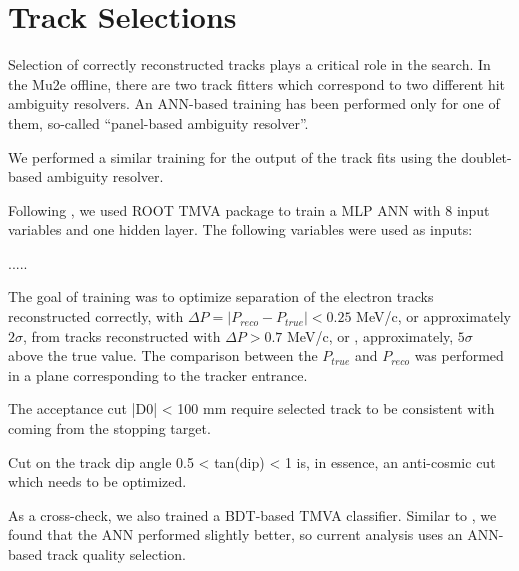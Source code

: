 \section{Track Selections}

Selection of correctly reconstructed tracks plays a critical role in the search.
In the Mu2e offline, there are two track fitters which correspond to two different
hit ambiguity resolvers. An ANN-based training has been performed only for one of them,
so-called ``panel-based ambiguity resolver''.

We performed a similar training for the output of the track fits using the doublet-based
ambiguity resolver.

Following \cite{MU2E_4595_ANN_TRAINING}, we used ROOT TMVA package to train a MLP ANN
with 8 input variables and one hidden layer. The following variables were used as inputs:

.....

The goal of training was to optimize separation of the electron tracks reconstructed correctly,
with $\Delta{P} = |P_{reco}-P_{true}| < 0.25$ MeV/c, or approximately $2\sigma$, from tracks
reconstructed with $\Delta{P} > 0.7$ MeV/c, or , approximately, $5\sigma$ above the true value.
The comparison between the $P_{true}$ and $P_{reco}$ was performed in a plane corresponding to
the tracker entrance. 

The acceptance cut |D0| < 100 mm require selected track to be consistent with coming
from the stopping target.

Cut on the track dip angle 0.5 < tan(dip) < 1 is, in essence, an anti-cosmic cut which
needs to be optimized.

As a cross-check, we also trained a BDT-based TMVA classifier. Similar to \cite{MU2E_33150_ANN_TRAINING},
we found that the ANN performed slightly better, so current analysis uses an ANN-based track
quality selection.


